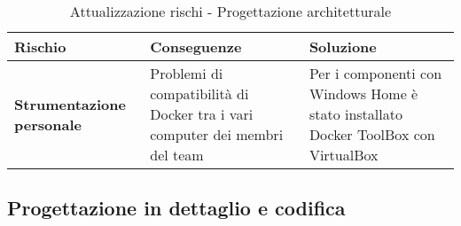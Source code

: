 		\newpage
		\begin{table}[H]
	\centering
	\begin{tabular}{| p{3cm} | p{6cm} | p{6cm}|}
		\hline
		\textbf{Rischio} & \textbf{Conseguenze} & \textbf{Soluzione} \\
		\hline
		\textbf{Strumentazione personale} & Problemi di compatibilità di Docker tra i vari computer dei membri del team & Per i componenti con Windows Home è stato installato Docker ToolBox con VirtualBox\\
		\hline
	\end{tabular}
	\caption[Attualizzazione rischi - Progettazione architetturale]{Attualizzazione rischi - Progettazione architetturale}
\end{table}
\newpage

\subsection{Progettazione in dettaglio e codifica} \label{pdatt}
